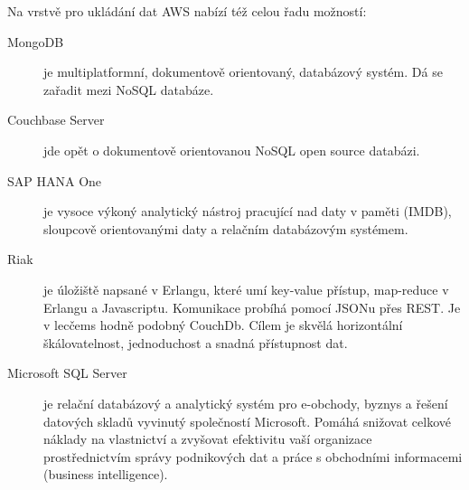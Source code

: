Na vrstvě pro ukládání dat AWS nabízí též celou řadu možností:
\begin{description}
	\item [MongoDB] je multiplatformní, dokumentově orientovaný, databázový systém. Dá se zařadit mezi NoSQL databáze.
	\item [Couchbase Server] jde opět o dokumentově orientovanou NoSQL open source databázi.
	\item [SAP HANA One] je vysoce výkoný analytický nástroj pracující nad daty v paměti (IMDB), sloupcově orientovanými daty a relačním databázovým systémem.
	\item [Riak] je úložiště napsané v Erlangu, které umí key-value přístup, map-reduce v Erlangu a Javascriptu. Komunikace probíhá pomocí JSONu přes REST. Je v lecčems hodně podobný CouchDb. Cílem je skvělá horizontální škálovatelnost, jednoduchost a snadná přístupnost dat.\cite{knesl:riak}
	\item [Microsoft SQL Server] je relační databázový a analytický systém pro e-obchody, byznys a řešení datových skladů vyvinutý společností Microsoft. Pomáhá snižovat celkové náklady na vlastnictví a zvyšovat efektivitu vaší organizace prostřednictvím správy podnikových dat a práce s obchodními informacemi (business intelligence).\cite{wiki:mssql}
\end{description}

